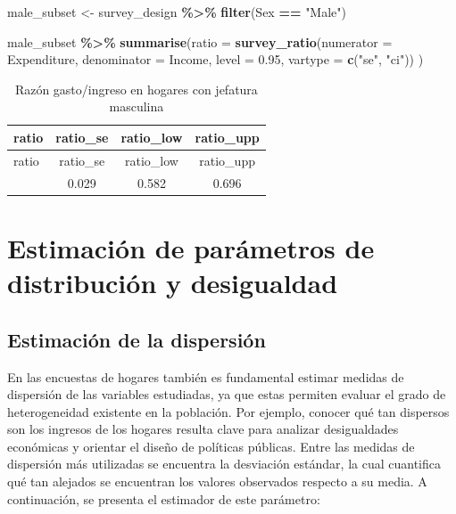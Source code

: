\documentclass[
  spanish,
  12pt,
]{book}
\newenvironment{Shaded}{\begin{snugshade}}{\end{snugshade}}
\newcommand{\AttributeTok}[1]{\textcolor[rgb]{0.13,0.29,0.53}{#1}}
\newcommand{\FloatTok}[1]{\textcolor[rgb]{0.00,0.00,0.81}{#1}}
\newcommand{\FunctionTok}[1]{\textcolor[rgb]{0.13,0.29,0.53}{\textbf{#1}}}
\newcommand{\NormalTok}[1]{#1}
\newcommand{\OtherTok}[1]{\textcolor[rgb]{0.56,0.35,0.01}{#1}}
\newcommand{\SpecialCharTok}[1]{\textcolor[rgb]{0.81,0.36,0.00}{\textbf{#1}}}
\newcommand{\StringTok}[1]{\textcolor[rgb]{0.31,0.60,0.02}{#1}}
\begin{document}
\begin{Shaded}
\begin{Highlighting}[]
\NormalTok{male\_subset }\OtherTok{\textless{}{-}}\NormalTok{ survey\_design }\SpecialCharTok{\%\textgreater{}\%}
  \FunctionTok{filter}\NormalTok{(Sex }\SpecialCharTok{==} \StringTok{"Male"}\NormalTok{)}

\NormalTok{male\_subset }\SpecialCharTok{\%\textgreater{}\%}
  \FunctionTok{summarise}\NormalTok{(}\AttributeTok{ratio =} \FunctionTok{survey\_ratio}\NormalTok{(}\AttributeTok{numerator =}\NormalTok{ Expenditure,}
                                 \AttributeTok{denominator =}\NormalTok{ Income,}
                                 \AttributeTok{level =} \FloatTok{0.95}\NormalTok{,}
                                 \AttributeTok{vartype =} \FunctionTok{c}\NormalTok{(}\StringTok{"se"}\NormalTok{, }\StringTok{"ci"}\NormalTok{))}
\NormalTok{            )}
\end{Highlighting}
\end{Shaded}

\begin{longtable}[]{@{}lccc@{}}
\caption{\label{tab:tab-razon-gasto-ingreso-hombre}Razón gasto/ingreso en hogares con jefatura masculina}\tabularnewline
\toprule\noalign{}
ratio & ratio\_se & ratio\_low & ratio\_upp \\
\midrule\noalign{}
\endfirsthead
\toprule\noalign{}
ratio & ratio\_se & ratio\_low & ratio\_upp \\
\midrule\noalign{}
\endhead
\bottomrule\noalign{}
\endlastfoot
0.639 & 0.029 & 0.582 & 0.696 \\
\end{longtable}

\section{Estimación de parámetros de distribución y desigualdad}\label{estimacion-de-parametros-de-distribucion-y-desigualdad}

\subsection{Estimación de la dispersión}\label{estimacion-de-la-dispersion}

En las encuestas de hogares también es fundamental estimar medidas de dispersión de las variables estudiadas, ya que estas permiten evaluar el grado de heterogeneidad existente en la población. Por ejemplo, conocer qué tan dispersos son los ingresos de los hogares resulta clave para analizar desigualdades económicas y orientar el diseño de políticas públicas. Entre las medidas de dispersión más utilizadas se encuentra la desviación estándar, la cual cuantifica qué tan alejados se encuentran los valores observados respecto a su media. A continuación, se presenta el estimador de este parámetro:
\end{document}
